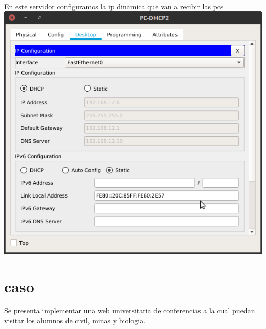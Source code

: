 \\En este servidor configuramos la ip dinamica que van a recibir las pcs
\\
\includegraphics[scale=0.5]{img/dhcpejem.png} 

\section{caso}
Se presenta implementar una web universitaria de conferencias a la cual puedan visitar los alumnos de civil, minas y biologia.\\

